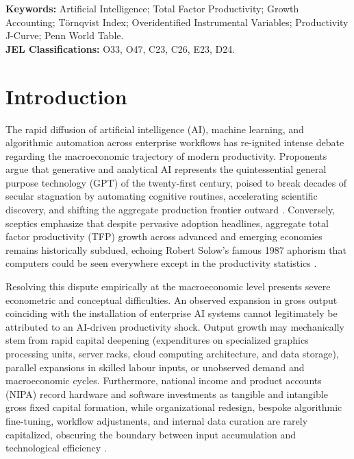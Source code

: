 \documentclass[11pt,a4paper]{article}
\begin{document}
\vspace{0.8em}
\noindent\textbf{Keywords:} Artificial Intelligence; Total Factor Productivity; Growth Accounting; Törnqvist Index; Overidentified Instrumental Variables; Productivity J-Curve; Penn World Table.\\
\textbf{JEL Classifications:} O33, O47, C23, C26, E23, D24.

\clearpage

\section{Introduction}
\label{sec:intro}

The rapid diffusion of artificial intelligence (AI), machine learning, and algorithmic automation across enterprise workflows has re-ignited intense debate regarding the macroeconomic trajectory of modern productivity. Proponents argue that generative and analytical AI represents the quintessential general purpose technology (GPT) of the twenty-first century, poised to break decades of secular stagnation by automating cognitive routines, accelerating scientific discovery, and shifting the aggregate production frontier outward \citep{brynjolfsson2017, ager2023, babina2024}. Conversely, sceptics emphasize that despite pervasive adoption headlines, aggregate total factor productivity (TFP) growth across advanced and emerging economies remains historically subdued, echoing Robert Solow's famous 1987 aphorism that computers could be seen everywhere except in the productivity statistics \citep{gordon2016, acemoglu2024}.

Resolving this dispute empirically at the macroeconomic level presents severe econometric and conceptual difficulties. An observed expansion in gross output coinciding with the installation of enterprise AI systems cannot legitimately be attributed to an AI-driven productivity shock. Output growth may mechanically stem from rapid capital deepening (expenditures on specialized graphics processing units, server racks, cloud computing architecture, and data storage), parallel expansions in skilled labour inputs, or unobserved demand and macroeconomic cycles. Furthermore, national income and product accounts (NIPA) record hardware and software investments as tangible and intangible gross fixed capital formation, while organizational redesign, bespoke algorithmic fine-tuning, workflow adjustments, and internal data curation are rarely capitalized, obscuring the boundary between input accumulation and technological efficiency \citep{corrado2021}. 
\end{document}
